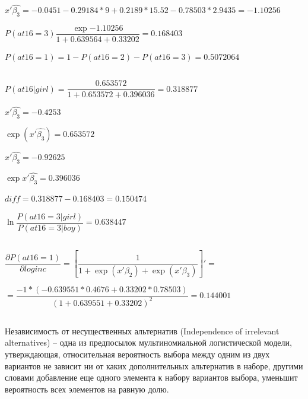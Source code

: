 \documentclass[12pt,a4paper, oneside]{extreport}
\begin{document}
$x'\hat{\beta_3} = -0.0451-0.29184*9+0.2189*15.52-0.78503*2.9435= -1.10256 $

$P(at16=3) \dfrac{\exp{-1.10256}}{1+0.639564+0.33202} = 0.168403$

$P(at16=1) = 1 - P(at16=2) - P(at16=3)  =  0.5072064 $


\subsection{}

$ P(at16|girl) = \dfrac{0.653572}{1+0.653572+0.396036} = 0.318877$

$x'\hat{\beta_3}  = -0.4253 $

$\exp{(x'\hat{\beta_3})}  = 0.653572 $


$x'\hat{\beta_3}  = -0.92625 $

$\exp{{x'\hat{\beta_3}}}  = 0.396036 $

$diff = 0.318877-0.168403=0.150474$


$\ln\dfrac{P(at16=3|girl)}{P(at16=3|boy)} = 0.638447$

\subsection{}


$\dfrac{\partial P(at16=1)}{\partial loginc} = \left[\dfrac{1}{1+ \exp{(x'\beta_2)} + \exp{(x'\beta_3)}} \right]' = $

$ = \dfrac{-1*(-0.639551*0.4676+0.33202*0.78503)}{(1+0.639551+0.33202)^2} = 0.144001$

\subsection{}

Независимость от несущественных альтернатив   (Independence of irrelevant alternatives) -- одна из предпосылок мультиномиальной логистической  модели,  утверждающая, относительная вероятность выбора между одним из двух вариантов не зависит ни от каких дополнительных альтернатив в наборе, другими словами  добавление   еще одного  элемента  к набору вариантов выбора, уменьшит вероятность всех элементов на равную долю.
\end{document}
